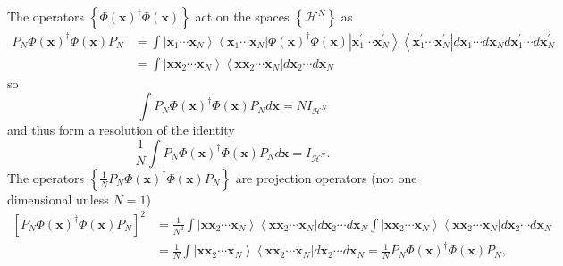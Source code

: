 \documentclass[aps,preprint]{revtex4}%
\begin{document}
The operators $\left\{  \Phi\left(  \mathbf{x}\right)  ^{\dagger}\Phi\left(
\mathbf{x}\right)  \right\}  $ act on the spaces $\left\{  \mathcal{H}%
^{N}\right\}  $ as
\begin{align}
P_{N}\Phi\left(  \mathbf{x}\right)  ^{\dagger}\Phi\left(  \mathbf{x}\right)
P_{N}  &  =\int\left\vert \mathbf{x}_{1}\cdots\mathbf{x}_{N}\right\rangle
\left\langle \mathbf{x}_{1}\cdots\mathbf{x}_{N}\right\vert \Phi\left(
\mathbf{x}\right)  ^{\dagger}\Phi\left(  \mathbf{x}\right)  \left\vert
\mathbf{x}_{1}^{\prime}\cdots\mathbf{x}_{N}^{\prime}\right\rangle \left\langle
\mathbf{x}_{1}^{\prime}\cdots\mathbf{x}_{N}^{\prime}\right\vert d\mathbf{x}%
_{1}\cdots d\mathbf{x}_{N}d\mathbf{x}_{1}^{\prime}\cdots d\mathbf{x}%
_{N}^{\prime}\nonumber\\
&  =\int\left\vert \mathbf{xx}_{2}\cdots\mathbf{x}_{N}\right\rangle
\left\langle \mathbf{xx}_{2}\cdots\mathbf{x}_{N}\right\vert d\mathbf{x}%
_{2}\cdots d\mathbf{x}_{N}%
\end{align}
so
\begin{equation}
\int P_{N}\Phi\left(  \mathbf{x}\right)  ^{\dagger}\Phi\left(  \mathbf{x}%
\right)  P_{N}d\mathbf{x}=NI_{\mathcal{H}^{N}}%
\end{equation}
and thus form a resolution of the identity
\begin{equation}
\frac{1}{N}\int P_{N}\Phi\left(  \mathbf{x}\right)  ^{\dagger}\Phi\left(
\mathbf{x}\right)  P_{N}d\mathbf{x}=I_{\mathcal{H}^{N}}.
\end{equation}
The operators $\left\{  \frac{1}{N}P_{N}\Phi\left(  \mathbf{x}\right)
^{\dagger}\Phi\left(  \mathbf{x}\right)  P_{N}\right\}  $ are projection
operators (not one dimensional unless $N=1$)
\begin{align}
\left[  P_{N}\Phi\left(  \mathbf{x}\right)  ^{\dagger}\Phi\left(
\mathbf{x}\right)  P_{N}\right]  ^{2}  &  =\frac{1}{N^{2}}\int\left\vert
\mathbf{xx}_{2}\cdots\mathbf{x}_{N}\right\rangle \left\langle \mathbf{xx}%
_{2}\cdots\mathbf{x}_{N}\right\vert d\mathbf{x}_{2}\cdots d\mathbf{x}_{N}%
\int\left\vert \mathbf{xx}_{2}\cdots\mathbf{x}_{N}\right\rangle \left\langle
\mathbf{xx}_{2}\cdots\mathbf{x}_{N}\right\vert d\mathbf{x}_{2}\cdots
d\mathbf{x}_{N}\nonumber\\
&  =\frac{1}{N}\int\left\vert \mathbf{xx}_{2}\cdots\mathbf{x}_{N}\right\rangle
\left\langle \mathbf{xx}_{2}\cdots\mathbf{x}_{N}\right\vert d\mathbf{x}%
_{2}\cdots d\mathbf{x}_{N}=\frac{1}{N}P_{N}\Phi\left(  \mathbf{x}\right)
^{\dagger}\Phi\left(  \mathbf{x}\right)  P_{N},
\end{align}
\end{document}

